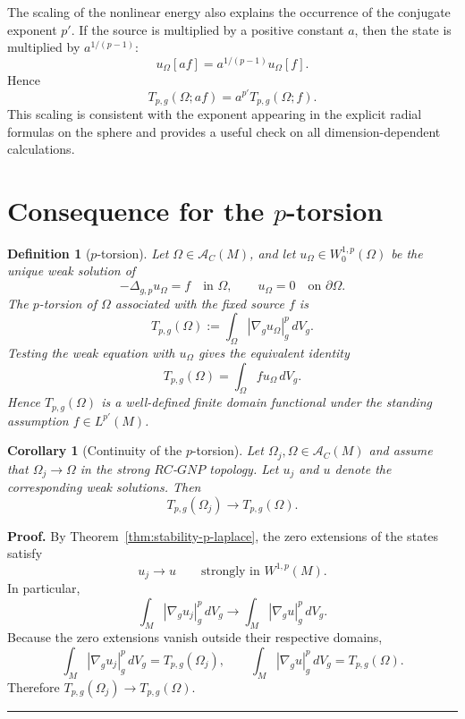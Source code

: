 \documentclass{article}
\renewcommand{\boxed}[1]{#1}
\newtheorem{corollary}[theorem]{Corollary}
\newtheorem{definition}[theorem]{Definition}
\newenvironment{proof}[1][Proof]{\textbf{#1.} }{\hfill\rule{0.5em}{0.5em}}
\begin{document}
The scaling of the nonlinear energy also explains the occurrence of the
conjugate exponent $p'$. If the source is multiplied by a positive
constant $a$, then the state is multiplied by $a^{1/(p-1)}$:
\[
u_\Omega[af]
=
a^{1/(p-1)}u_\Omega[f].
\]
Hence
\[
T_{p,g}(\Omega;af)
=
a^{p'}T_{p,g}(\Omega;f).
\]
This scaling is consistent with the exponent appearing in the explicit
radial formulas on the sphere and provides a useful check on all
dimension-dependent calculations.

\section{Consequence for the $p$-torsion}

\begin{definition}[$p$-torsion]
\label{def:p-torsion}
Let $\Omega\in\mathcal A_C(M)$, and let $u_\Omega\in W_0^{1,p}(\Omega)$
be the unique weak solution of
\[
-\Delta_{g,p}u_\Omega=f\quad\text{in }\Omega,
\qquad
u_\Omega=0\quad\text{on }\partial\Omega.
\]
The \emph{$p$-torsion} of $\Omega$ associated with the fixed source $f$ is
\[
\boxed{
T_{p,g}(\Omega):=\int_\Omega|\nabla_g u_\Omega|_g^p\,dV_g.
}
\]
Testing the weak equation with $u_\Omega$ gives the equivalent identity
\[
T_{p,g}(\Omega)=\int_\Omega f u_\Omega\,dV_g.
\]
Hence $T_{p,g}(\Omega)$ is a well-defined finite domain functional under
the standing assumption $f\in L^{p'}(M)$.
\end{definition}

\begin{corollary}[Continuity of the $p$-torsion]
\label{cor:continuity-p-torsion}
Let $\Omega_j,\Omega\in\mathcal A_C(M)$ and assume that
$\Omega_j\to\Omega$ in the strong $RC$-$GNP$ topology. Let $u_j$ and
$u$ denote the corresponding weak solutions. Then
\[
T_{p,g}(\Omega_j)\longrightarrow T_{p,g}(\Omega).
\]
\end{corollary}

\begin{proof}
By Theorem~\ref{thm:stability-p-laplace}, the zero extensions of the
states satisfy
\[
u_j\longrightarrow u\qquad\text{strongly in }W^{1,p}(M).
\]
In particular,
\[
\int_M|\nabla_g u_j|_g^p\,dV_g
\longrightarrow
\int_M|\nabla_g u|_g^p\,dV_g.
\]
Because the zero extensions vanish outside their respective domains,
\[
\int_M|\nabla_g u_j|_g^p\,dV_g=T_{p,g}(\Omega_j),
\qquad
\int_M|\nabla_g u|_g^p\,dV_g=T_{p,g}(\Omega).
\]
Therefore $T_{p,g}(\Omega_j)\to T_{p,g}(\Omega)$.
\end{proof}
\end{document}

